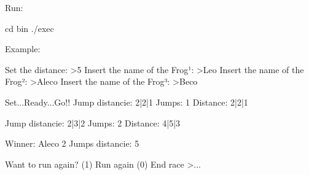 Run\+: \begin{DoxyVerb}cd bin
./exec
\end{DoxyVerb}


Example\+: \begin{DoxyVerb}Set the distance: 
>5
Insert the name of the Frog¹: 
>Leo
Insert the name of the Frog²: 
>Aleco
Insert the name of the Frog³: 
>Beco

Set...Ready...Go!!
Jump distancie: 2|2|1
Jumps: 1
Distance: 2|2|1

Jump distancie: 2|3|2
Jumps: 2
Distance: 4|5|3

Winner: Aleco
2 Jumps
distancie: 5

Want to run again? 
(1) Run again
(0) End race 
>...\end{DoxyVerb}
 